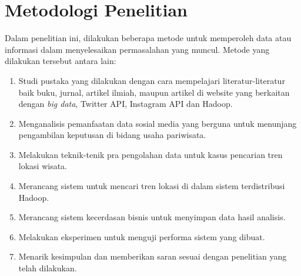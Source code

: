 \section{Metodologi Penelitian}
\label{sec:metodologi_penelitian}
Dalam penelitian ini, dilakukan beberapa metode untuk memperoleh data atau informasi dalam menyelesaikan permasalahan yang muncul. Metode yang dilakukan tersebut antara lain:
\begin{enumerate}
	\item Studi pustaka yang dilakukan dengan cara mempelajari literatur-literatur baik buku, jurnal, artikel ilmiah, maupun artikel di website yang berkaitan dengan  \textit{big data}, Twitter API, Instagram API dan Hadoop.
	\item Menganalisis pemanfaatan data sosial media yang berguna untuk menunjang pengambilan keputusan di bidang usaha pariwisata.
	\item Melakukan teknik-tenik pra pengolahan data untuk kasus pencarian tren lokasi wisata.
	\item Merancang sistem untuk mencari tren lokasi di dalam sistem terdistribusi Hadoop.
	\item Merancang sistem kecerdasan bisnis untuk menyimpan data hasil analisis.
	\item Melakukan eksperimen untuk menguji performa sistem yang dibuat.
	\item Menarik kesimpulan dan memberikan saran sesuai dengan penelitian yang telah dilakukan. 
\end{enumerate}

